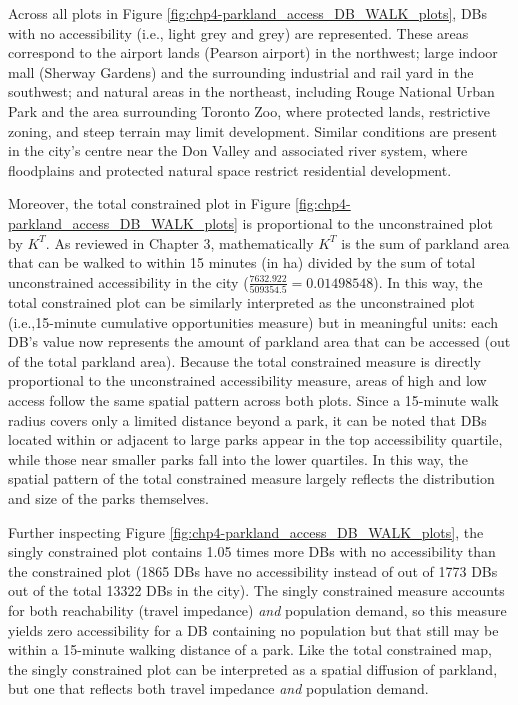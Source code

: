 \documentclass[
11pt, %
oneside, %
english, %
singlespacing, %
]{macthesis} %
\begin{document}
Across all plots in Figure \ref{fig:chp4-parkland_access_DB_WALK_plots}, DBs with no accessibility (i.e., light grey and grey) are represented. These areas correspond to the airport lands (Pearson airport) in the northwest; large indoor mall (Sherway Gardens) and the surrounding industrial and rail yard in the southwest; and natural areas in the northeast, including Rouge National Urban Park and the area surrounding Toronto Zoo, where protected lands, restrictive zoning, and steep terrain may limit development. Similar conditions are present in the city's centre near the Don Valley and associated river system, where floodplains and protected natural space restrict residential development.

Moreover, the total constrained plot in Figure \ref{fig:chp4-parkland_access_DB_WALK_plots} is proportional to the unconstrained plot by \(K^T\). As reviewed in Chapter 3, mathematically \(K^T\) is the sum of parkland area that can be walked to within 15 minutes (in ha) divided by the sum of total unconstrained accessibility in the city (\(\frac{7632.922}{509354.5} = 0.01498548\)). In this way, the total constrained plot can be similarly interpreted as the unconstrained plot (i.e.,15-minute cumulative opportunities measure) but in meaningful units: each DB's value now represents the amount of parkland area that can be accessed (out of the total parkland area). Because the total constrained measure is directly proportional to the unconstrained accessibility measure, areas of high and low access follow the same spatial pattern across both plots. Since a 15-minute walk radius covers only a limited distance beyond a park, it can be noted that DBs located within or adjacent to large parks appear in the top accessibility quartile, while those near smaller parks fall into the lower quartiles. In this way, the spatial pattern of the total constrained measure largely reflects the distribution and size of the parks themselves.

Further inspecting Figure \ref{fig:chp4-parkland_access_DB_WALK_plots}, the singly constrained plot contains 1.05 times more DBs with no accessibility than the constrained plot (1865 DBs have no accessibility instead of out of 1773 DBs out of the total 13322 DBs in the city). The singly constrained measure accounts for both reachability (travel impedance) \emph{and} population demand, so this measure yields zero accessibility for a DB containing no population but that still may be within a 15-minute walking distance of a park. Like the total constrained map, the singly constrained plot can be interpreted as a spatial diffusion of parkland, but one that reflects both travel impedance \emph{and} population demand.
\end{document}

